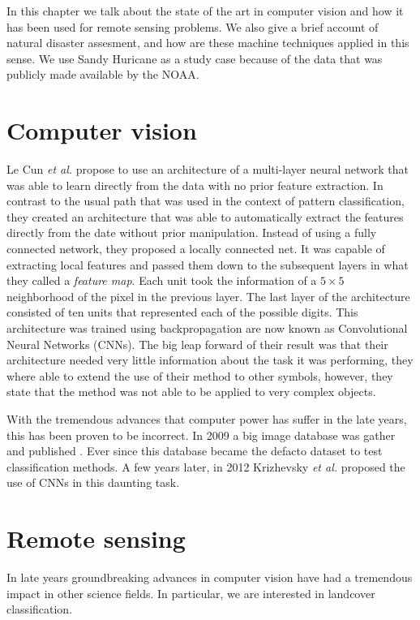 In this chapter we talk about the state of the art in computer vision and how it has been used for remote sensing problems. We also give a brief account of natural disaster assesment, and how are these machine techniques applied in this sense. We use Sandy Huricane as a study case because of the data that was publicly made available by the NOAA.

\section{Computer vision}

 Le Cun \textit{et al.} \cite{lecun} propose to use an architecture of a multi-layer neural network that was able to learn directly from the data with no prior feature extraction. In contrast to the usual path that was used in the context of pattern classification, they created an architecture that was able to automatically extract the features directly from the date without prior manipulation. Instead of using a fully connected network, they proposed a locally connected net. It was capable of extracting local features and passed them down to the subsequent layers in what they called a \textit{feature map}. Each unit took the information of a $5\times 5$ neighborhood of the pixel in the previous layer. The last layer of the architecture consisted of ten units that represented each of the possible digits. This architecture was trained using backpropagation are now known as Convolutional Neural Networks (CNNs). The big leap forward of their result was that their architecture needed very little information about the task it was performing, they where able to extend the use of their method to other symbols, however, they state that the method was not able to be applied to very complex objects. 


 With the tremendous advances that computer power has suffer in the late years, this has been proven to be incorrect. In 2009 a big image database was gather and published \cite{imagenet}. Ever since this database became the defacto dataset to test classification methods. A few years later, in 2012 Krizhevsky \textit{et al.} \cite{krizhevsky} proposed the use of CNNs in this daunting task.

\section{Remote sensing}


In late years groundbreaking advances in computer vision have had a tremendous impact in other science fields. In particular, we are interested in landcover classification. 


